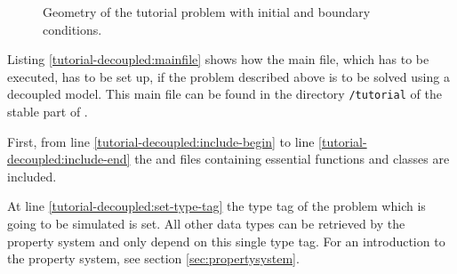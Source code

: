 \begin{figure}[ht]
\centering
{}
\caption{Geometry of the tutorial problem with initial and boundary conditions.}
\label{tutorial-decoupled:problemfigure}
\end{figure}

Listing \ref{tutorial-decoupled:mainfile} shows how the main file, which has to be
executed, has to be set up, if the problem described above is to be solved using
a decoupled model. This main file can be found in the directory \texttt{/tutorial}
of the stable part of \Dumux.

\begin{lst}\label{tutorial-decoupled:mainfile} \mbox{}

\end{lst}

First, from line \ref{tutorial-decoupled:include-begin} to line
\ref{tutorial-decoupled:include-end} the \Dune and \Dumux files containing
essential functions and classes are included.

At line \ref{tutorial-decoupled:set-type-tag} the type tag of the
problem which is going to be simulated is set. All other data types
can be retrieved by the \Dumux property system and only depend on this
single type tag. For an introduction to the
property system, see section \ref{sec:propertysystem}.

